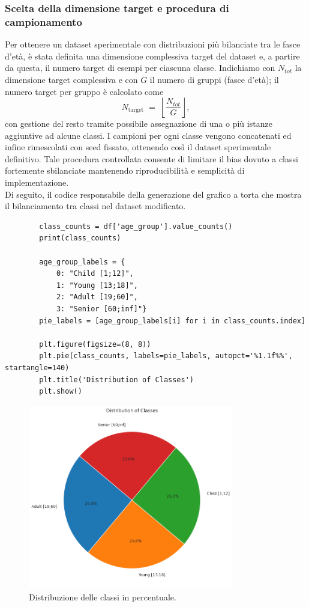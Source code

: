 \documentclass[a4paper,12pt]{report}
\begin{document}
	\subsubsection{Scelta della dimensione target e procedura di campionamento}
	Per ottenere un dataset sperimentale con distribuzioni più bilanciate tra le fasce d'età, è stata definita una dimensione complessiva target del dataset e, a partire da questa, il numero target di esempi per ciascuna classe. Indichiamo con \(N_{tot}\) la dimensione target complessiva e con \(G\) il numero di gruppi (fasce d'età); il numero target per gruppo è calcolato come
	\[
	N_{\text{target}} \;=\; \left\lfloor \frac{N_{tot}}{G} \right\rfloor,
	\]
	con gestione del resto tramite possibile assegnazione di una o più istanze aggiuntive ad alcune classi. I campioni per ogni classe vengono concatenati ed infine rimescolati con seed fissato, ottenendo così il dataset sperimentale definitivo. Tale procedura controllata consente di limitare il bias dovuto a classi fortemente sbilanciate mantenendo riproducibilità e semplicità di implementazione. \\
	Di seguito, il codice responsabile della generazione del grafico a torta che mostra il bilanciamento tra classi nel dataset modificato.
	\begin{verbatim}
		class_counts = df['age_group'].value_counts()
		print(class_counts)
		
		age_group_labels = {
			0: "Child [1;12]", 
			1: "Young [13;18]", 
			2: "Adult [19;60]", 
			3: "Senior [60;inf]"}
		pie_labels = [age_group_labels[i] for i in class_counts.index]
		
		plt.figure(figsize=(8, 8))
		plt.pie(class_counts, labels=pie_labels, autopct='%1.1f%%', startangle=140)
		plt.title('Distribution of Classes')
		plt.show()
	\end{verbatim}
	
	\begin{figure}[H]
		\centering
		\includegraphics[width=0.8\textwidth]{img/pie_agegroup_image.png}
		\caption{Distribuzione delle classi in percentuale.}
	\end{figure}
	
\end{document}
